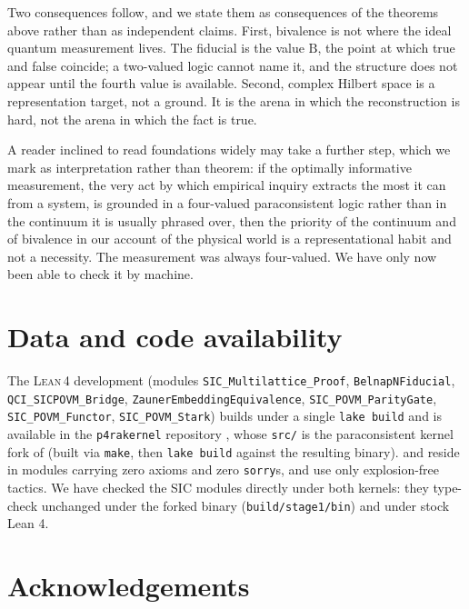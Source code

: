 \documentclass[12pt,a4paper]{article}
\newcommand{\Lean}{\textsc{Lean\,4}}
\begin{document}
Two consequences follow, and we state them as consequences of the theorems
above rather than as independent claims. First, bivalence is not where the
ideal quantum measurement lives. The fiducial is the value $\mathrm{B}$, the
point at which true and false coincide; a two-valued logic cannot name it, and
the structure does not appear until the fourth value is available. Second,
complex Hilbert space is a representation target, not a ground. It is the arena
in which the reconstruction is hard, not the arena in which the fact is true.

A reader inclined to read foundations widely may take a further step, which we
mark as interpretation rather than theorem: if the optimally informative
measurement, the very act by which empirical inquiry extracts the most it can
from a system, is grounded in a four-valued paraconsistent logic rather than in
the continuum it is usually phrased over, then the priority of the continuum
and of bivalence in our account of the physical world is a representational
habit and not a necessity. The measurement was always four-valued. We have
only now been able to check it by machine.

\section*{Data and code availability}

The \Lean{} development (modules \texttt{SIC\_Multilattice\_Proof},
\texttt{BelnapNFiducial}, \texttt{QCI\_SICPOVM\_Bridge},
\texttt{ZaunerEmbeddingEquivalence}, \texttt{SIC\_POVM\_ParityGate},
\texttt{SIC\_POVM\_Functor}, \texttt{SIC\_POVM\_Stark}) builds under a single
\texttt{lake build} and is available in the \texttt{p4rakernel} repository
\cite{p4rakernel}, whose \texttt{src/} is the paraconsistent kernel fork of
 (built via \texttt{make}, then \texttt{lake build} against the
resulting binary).  and 
reside in modules carrying zero axioms and zero \texttt{sorry}s, and use only
explosion-free tactics. We have checked the SIC modules directly under both
kernels: they type-check unchanged under the forked binary
(\texttt{build/stage1/bin}) and under stock Lean 4.

\section*{Acknowledgements}
\end{document}
